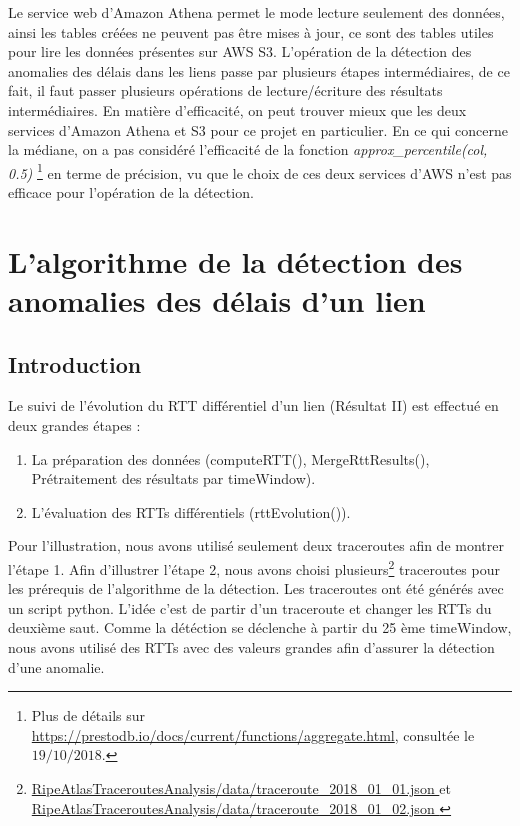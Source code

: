 Le service web d'Amazon Athena permet le mode lecture seulement des données, ainsi les tables créées ne peuvent pas être mises à jour, ce sont des tables utiles pour lire les données présentes sur AWS S3.  L'opération de la détection des anomalies des délais dans les liens passe par plusieurs étapes intermédiaires, de ce fait, il faut passer plusieurs opérations de lecture/écriture des résultats intermédiaires. En matière d'efficacité, on peut trouver mieux que les deux services d'Amazon  Athena et S3 pour ce projet en particulier.  En ce qui concerne la médiane, on a pas considéré l'efficacité de la fonction \textit{approx\_percentile(col, 0.5)} \footnote{Plus de détails sur \url{https://prestodb.io/docs/current/functions/aggregate.html}, consultée le $19/10/2018$.} en terme de précision, vu que le choix de ces deux services d'AWS n'est pas efficace pour l'opération de la détection.
 


\newpage
\section{L'algorithme de la détection des anomalies des délais d'un lien}

\subsection{Introduction}
Le suivi de l'évolution du RTT différentiel d'un lien (Résultat II) est effectué en deux grandes étapes : 
\begin{enumerate}
	\item La préparation des données (computeRTT(), MergeRttResults(), Prétraitement des résultats par timeWindow).
	\item L'évaluation des RTTs différentiels (rttEvolution()).
\end{enumerate}

Pour l'illustration, nous avons utilisé seulement deux traceroutes afin de montrer l'étape 1. Afin d'illustrer l'étape 2, nous avons choisi plusieurs\footnote{\url{ RipeAtlasTraceroutesAnalysis/data/traceroute_2018_01_01.json } et \url{ RipeAtlasTraceroutesAnalysis/data/traceroute_2018_01_02.json }} traceroutes pour les prérequis de l'algorithme de la détection. Les traceroutes ont été générés avec un script python. L'idée c'est de partir d'un traceroute et changer les RTTs du deuxième saut. Comme la détéction se déclenche à partir du 25 ème timeWindow, nous avons utilisé des RTTs avec des valeurs grandes afin d'assurer la détection d'une anomalie. 

